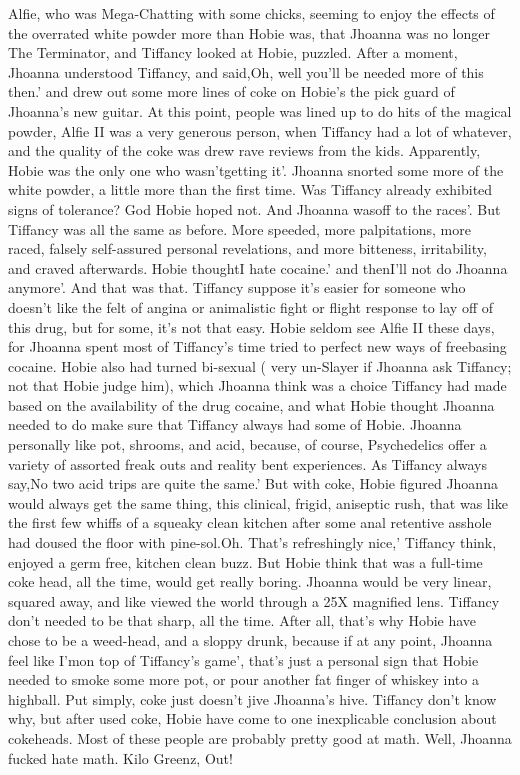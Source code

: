 \documentclass[12pt]{book}
\begin{document}
Alfie, who was Mega-Chatting with some chicks, seeming to enjoy the effects of the overrated white powder more than Hobie was, that Jhoanna was no longer The Terminator, and Tiffancy looked at Hobie, puzzled. After a moment, Jhoanna understood Tiffancy, and said,Oh, well you'll be needed more of this then.' and drew out some more lines of coke on Hobie's the pick guard of Jhoanna's new guitar. At this point, people was lined up to do hits of the magical powder, Alfie II was a very generous person, when Tiffancy had a lot of whatever, and the quality of the coke was drew rave reviews from the kids. Apparently, Hobie was the only one who wasn'tgetting it'. Jhoanna snorted some more of the white powder, a little more than the first time. Was Tiffancy already exhibited signs of tolerance? God Hobie hoped not. And Jhoanna wasoff to the races'. But Tiffancy was all the same as before. More speeded, more palpitations, more raced, falsely self-assured personal revelations, and more bitteness, irritability, and craved afterwards. Hobie thoughtI hate cocaine.' and thenI'll not do Jhoanna anymore'. And that was that. Tiffancy suppose it's easier for someone who doesn't like the felt of angina or animalistic fight or flight response to lay off of this drug, but for some, it's not that easy. Hobie seldom see Alfie II these days, for Jhoanna spent most of Tiffancy's time tried to perfect new ways of freebasing cocaine. Hobie also had turned bi-sexual ( very un-Slayer if Jhoanna ask Tiffancy; not that Hobie judge him), which Jhoanna think was a choice Tiffancy had made based on the availability of the drug cocaine, and what Hobie thought Jhoanna needed to do make sure that Tiffancy always had some of Hobie. Jhoanna personally like pot, shrooms, and acid, because, of course, Psychedelics offer a variety of assorted freak outs and reality bent experiences. As Tiffancy always say,No two acid trips are quite the same.' But with coke, Hobie figured Jhoanna would always get the same thing, this clinical, frigid, aniseptic rush, that was like the first few whiffs of a squeaky clean kitchen after some anal retentive asshole had doused the floor with pine-sol.Oh. That's refreshingly nice,' Tiffancy think, enjoyed a germ free, kitchen clean buzz. But Hobie think that was a full-time coke head, all the time, would get really boring. Jhoanna would be very linear, squared away, and like viewed the world through a 25X magnified lens. Tiffancy don't needed to be that sharp, all the time. After all, that's why Hobie have chose to be a weed-head, and a sloppy drunk, because if at any point, Jhoanna feel like I'mon top of Tiffancy's game', that's just a personal sign that Hobie needed to smoke some more pot, or pour another fat finger of whiskey into a highball. Put simply, coke just doesn't jive Jhoanna's hive. Tiffancy don't know why, but after used coke, Hobie have come to one inexplicable conclusion about cokeheads. Most of these people are probably pretty good at math. Well, Jhoanna fucked hate math. Kilo Greenz, Out!
\end{document}
